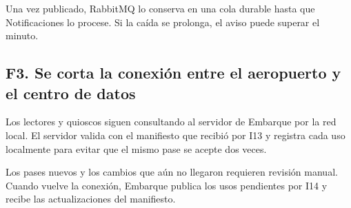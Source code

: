 \documentclass[11pt,a4paper]{article}
\begin{document}
Una vez publicado, RabbitMQ lo conserva en una cola durable hasta que Notificaciones lo procese. Si la caída se prolonga, el aviso puede superar el minuto.

\subsection*{F3. Se corta la conexión entre el aeropuerto y el centro de datos}

Los lectores y quioscos siguen consultando al servidor de Embarque por la red local. El servidor valida con el manifiesto que recibió por I13 y registra cada uso localmente para evitar que el mismo pase se acepte dos veces.

Los pases nuevos y los cambios que aún no llegaron requieren revisión manual. Cuando vuelve la conexión, Embarque publica los usos pendientes por I14 y recibe las actualizaciones del manifiesto.

{\small\printbibliography[title={Referencias}]}
\end{document}
